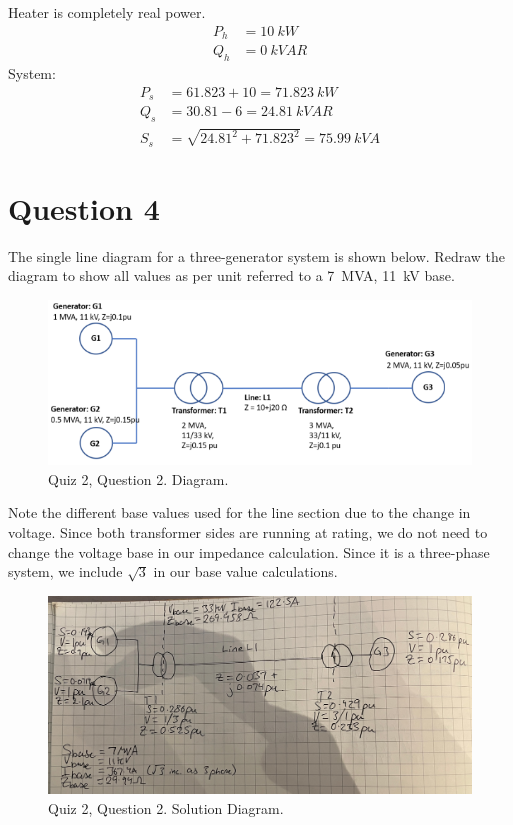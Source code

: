 Heater is completely real power.
\begin{align}
    P_h & = \SI{10}{kW}  \\
    Q_h & = \SI{0}{kVAR}
\end{align}
System:
\begin{align}
    P_s & = 61.823+10= \SI{71.823}{kW}                \\
    Q_s & = 30.81-6=\SI{24.81}{kVAR}                  \\
    S_s & = \sqrt{24.81^2+71.823^2} = \SI{75.99}{kVA}
\end{align}
\section{Question 4}
The single line diagram for a three-generator system is shown below. Redraw the diagram to show all values as per unit referred to a \SI{7}{MVA}, \SI{11}{kV} base.
\begin{figure}[H]
    \centering
    \includegraphics[width = \textwidth]{img/figure153.png}
    \caption{Quiz 2, Question 2. Diagram.}
\end{figure}
Note the different base values used for the line section due to the change in voltage. Since both transformer sides are running at rating, we do not need to change the voltage base in our impedance calculation. Since it is a three-phase system, we include $\sqrt{3}$ in our base value calculations.
\begin{figure}[H]
    \centering
    \includegraphics[width = \textwidth]{img/figure152.jpg}
    \caption{Quiz 2, Question 2. Solution Diagram.}
\end{figure}
